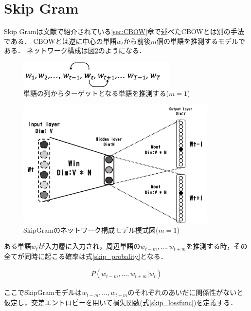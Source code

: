 \documentclass[a4j,11pt,report]{jsbook}
\begin{document}
\section{Skip Gram \label{sec:SkipGram}}
Skip Gramは文献\cite{SkipCBOW}で紹介されている\ref{sec:CBOW}章で述べたCBOWとは別の手法である．
CBOWとは逆に中心の単語$w_{t}$から前後$m$個の単語を推測するモデルである．
ネットワーク構成は図\ref{fig:SkipGramimage}のようになる．

\begin{figure}[H]
  \centering
  \includegraphics[width = 80mm]{image/skipgram_w1w2wt-1wtwt+1.png}
  \caption{単語の列からターゲットとなる単語を推測する($m = 1$)}
  \label{fig:Skipformula}
\end{figure}


\begin{figure}[H]
  \centering
  \includegraphics[width = 100mm]{image/SkipGram_windowsize_1.png}
  \caption{SkipGramのネットワーク構成モデル模式図($ m = 1$) }
  \label{fig:SkipGramimage}
\end{figure}



ある単語$w_{t}$が入力層に入力され，周辺単語の$w_{t-m},...,w_{t+m}$を推測する時，その全てが同時に起こる確率は式\ref{skip_probality}となる．

\begin{equation}
  \label{skip_probality}
  \begin{array}{c}
    P(w_{t-m},...,w_{t+m}|w_{t})
  \end{array}
\end{equation}

ここでSkipGramモデルは$w_{t-m},...,w_{t+m}$のそれぞれのあいだに関係性がないと仮定し，交差エントロピーを用いて損失関数(式\ref{skip_lossfunc})を定義する．
\end{document}
